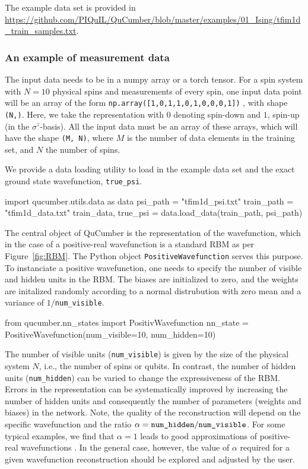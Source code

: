 \documentclass[submission, Phys]{SciPost}
\begin{document}
The example data set is provided in \url{https://github.com/PIQuIL/QuCumber/blob/master/examples/01_Ising/tfim1d_train_samples.txt}.

\subsubsection{An example of measurement data}
\label{subsec:example}

The input data needs to be in a numpy array or a torch tensor.
For a spin system with $N=10$ physical spins and measurements of every spin, one input data point will be an array of the form
\verb|np.array([1,0,1,1,0,1,0,0,0,1])|
, with shape \verb|(N,)|.
Here, we take the representation with $0$ denoting spin-down and $1$, spin-up (in the $\sigma^z$-basis).
All the input data must be an array of these arrays, which will have the shape \verb|(M, N)|, where $M$ is the number of data elements in the training set, and $N$ the number of spins.

We provide a data loading utility to load in the example data set and the exact ground state wavefunction, \verb|true_psi|.
\begin{python}
import qucumber.utils.data as data
psi_path = "tfim1d_psi.txt"
train_path = "tfim1d_data.txt"
train_data, true_psi = data.load_data(train_path, psi_path)
\end{python}

The central object of QuCumber is the representation of the wavefunction, which in the case of a positive-real wavefunction
is a standard RBM as per Figure~\ref{fig:RBM}.
The Python object \verb|PositiveWavefunction| serves this purpose.
To instanciate a positive wavefunction, one needs to specify the number of visible and hidden units in the RBM.
The biases are initialized to zero, and the weights are initalized randomly according to a normal distrubution with zero mean and a variance of $1/$\verb|num_visible|.
\begin{python}
from qucumber.nn_states import PositivWavefunction
nn_state = PositiveWavefunction(num_visible=10, num_hidden=10)
\end{python}
The number of visible units (\verb|num_visible|) is given by the size of the physical system $N$, i.e., the number of spins or qubits.
In contrast, the number of hidden units (\verb|num_hidden|) can be varied to change the expressiveness of the RBM.
Errors in the representation can be systematically improved by increasing the number of hidden units and consequently
the number of parameters (weights and biases) in the network.
Note, the quality of the reconstruction will depend on the specific wavefunction and the ratio $\alpha = \verb|num_hidden|/\verb|num_visible|$.
For some typical examples, we find that $\alpha = 1$ leads to good approximations of positive-real wavefunctions \cite{Torlai2016thermo}.
In the general case, however, the value of $\alpha$ required for a given wavefunction reconstruction should be explored and adjusted by the user.
\end{document}
